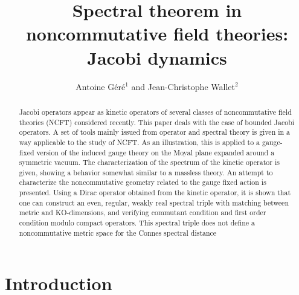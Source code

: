 \documentclass[a4paper]{jpconf}
\numberwithin{equation}{section}
\theoremstyle{nonumberplain}
\begin{document}

\title{Spectral theorem in noncommutative field theories: Jacobi dynamics}

\author{Antoine G\'er\'e$^1$ and Jean-Christophe Wallet$^2$}

\address{$^1$Dipartimento di Matematica, Universit\`a di Genova, Via Dodecaneso, 35, I-16146 Genova, Italy}

\address{$^2$Laboratoire de Physique Th\'eorique d'Orsay, B\^at. 210, CNRS and Universit\'e Paris-Sud 11, 91405 Orsay Cedex, France}





\begin{abstract}
Jacobi operators appear as kinetic operators of several classes of noncommutative field theories (NCFT) considered recently. This paper deals with the case of bounded Jacobi operators. A set of tools mainly issued from operator and spectral theory is given in a way applicable to the study of NCFT. As an illustration, this is applied to a gauge-fixed version of the induced gauge theory on the Moyal plane expanded around a symmetric vacuum. The characterization of the spectrum of the kinetic operator is given, showing a behavior somewhat similar to a massless theory. An attempt to characterize the noncommutative geometry related to the gauge fixed action is presented. Using a Dirac operator obtained from the kinetic operator, it is shown that one can construct an even, regular, weakly real spectral triple with matching between metric and KO-dimensions, and verifying commutant condition and first order condition modulo compact operators. This spectral triple does not define a noncommutative metric space for the 
Connes spectral distance
\end{abstract}


\section{Introduction}
\end{document}
